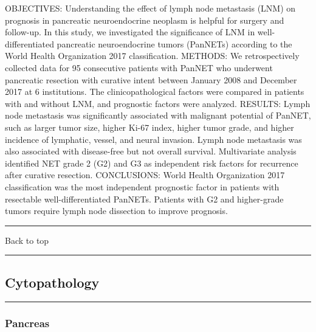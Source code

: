 \documentclass[]{article}
\begin{document}
OBJECTIVES: Understanding the effect of lymph node metastasis (LNM) on
prognosis in pancreatic neuroendocrine neoplasm is helpful for surgery
and follow-up. In this study, we investigated the significance of LNM in
well-differentiated pancreatic neuroendocrine tumors (PanNETs) according
to the World Health Organization 2017 classification. METHODS: We
retrospectively collected data for 95 consecutive patients with PanNET
who underwent pancreatic resection with curative intent between January
2008 and December 2017 at 6 institutions. The clinicopathological
factors were compared in patients with and without LNM, and prognostic
factors were analyzed. RESULTS: Lymph node metastasis was significantly
associated with malignant potential of PanNET, such as larger tumor
size, higher Ki-67 index, higher tumor grade, and higher incidence of
lymphatic, vessel, and neural invasion. Lymph node metastasis was also
associated with disease-free but not overall survival. Multivariate
analysis identified NET grade 2 (G2) and G3 as independent risk factors
for recurrence after curative resection. CONCLUSIONS: World Health
Organization 2017 classification was the most independent prognostic
factor in patients with resectable well-differentiated PanNETs. Patients
with G2 and higher-grade tumors require lymph node dissection to improve
prognosis.

{}

{}

\begin{center}\rule{0.5\linewidth}{\linethickness}\end{center}

Back to top

\begin{center}\rule{0.5\linewidth}{\linethickness}\end{center}

\pagebreak

\hypertarget{cytopathology}{%
\subsection{Cytopathology}\label{cytopathology}}

\begin{center}\rule{0.5\linewidth}{\linethickness}\end{center}

\hypertarget{pancreas-1}{%
\subsubsection{Pancreas}\label{pancreas-1}}
\end{document}
